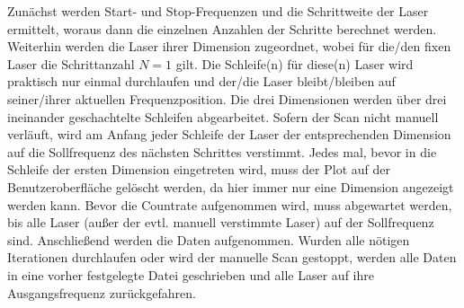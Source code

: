 Zunächst werden Start- und Stop-Frequenzen und die Schrittweite der Laser
ermittelt, woraus dann die einzelnen Anzahlen der Schritte berechnet werden.
Weiterhin werden die Laser ihrer Dimension zugeordnet, wobei für die/den fixen
Laser die Schrittanzahl $N=1$ gilt. Die Schleife(n) für diese(n) Laser wird
praktisch nur einmal durchlaufen und der/die Laser bleibt/bleiben auf
seiner/ihrer aktuellen Frequenzposition. Die drei Dimensionen werden über
drei ineinander geschachtelte Schleifen abgearbeitet. Sofern der Scan nicht
manuell verläuft, wird am Anfang jeder Schleife der Laser der entsprechenden
Dimension auf die Sollfrequenz des nächsten Schrittes verstimmt. Jedes mal, bevor in die Schleife
der ersten Dimension eingetreten wird, muss der Plot auf der Benutzeroberfläche
gelöscht werden, da hier immer nur eine Dimension angezeigt werden kann. Bevor
die Countrate aufgenommen wird, muss abgewartet werden, bis alle Laser (außer
der evtl. manuell verstimmte Laser) auf der Sollfrequenz sind.
Anschließend werden die Daten aufgenommen. Wurden alle nötigen Iterationen
durchlaufen oder wird der manuelle Scan gestoppt, werden alle Daten in eine
vorher festgelegte Datei geschrieben und alle Laser auf ihre Ausgangsfrequenz
zurückgefahren.